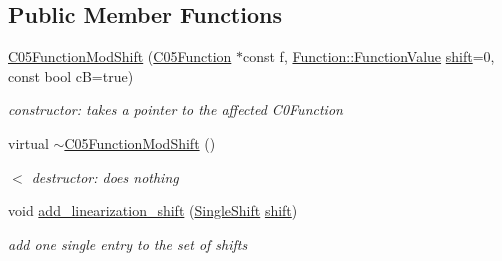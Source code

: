 \subsection*{Public Member Functions}
\begin{DoxyCompactItemize}
\item 
\mbox{\label{class_s_m_spp__di__unipi__it_1_1_c05_function_mod_shift_ac4a61aab21e776c72987bc4aaa075454}} 
\mbox{\hyperlink{class_s_m_spp__di__unipi__it_1_1_c05_function_mod_shift_ac4a61aab21e776c72987bc4aaa075454}{C05\+Function\+Mod\+Shift}} (\mbox{\hyperlink{class_s_m_spp__di__unipi__it_1_1_c05_function}{C05\+Function}} $\ast$const f, \mbox{\hyperlink{class_s_m_spp__di__unipi__it_1_1_function_a9ad432406b609e28d340f73e9474bffe}{Function\+::\+Function\+Value}} \mbox{\hyperlink{class_s_m_spp__di__unipi__it_1_1_function_mod_a177a0111cf0d0fdc5409df06c3b5e282}{shift}}=0, const bool cB=true)
\begin{DoxyCompactList}\small\item\em constructor\+: takes a pointer to the affected C0Function \end{DoxyCompactList}\item 
\mbox{\label{class_s_m_spp__di__unipi__it_1_1_c05_function_mod_shift_a500b054ef82eaca52e82edb8f0dff1d6}} 
virtual \mbox{\hyperlink{class_s_m_spp__di__unipi__it_1_1_c05_function_mod_shift_a500b054ef82eaca52e82edb8f0dff1d6}{$\sim$\+C05\+Function\+Mod\+Shift}} ()
\begin{DoxyCompactList}\small\item\em $<$ destructor\+: does nothing \end{DoxyCompactList}\item 
\mbox{\label{class_s_m_spp__di__unipi__it_1_1_c05_function_mod_shift_a679ca9c4b88900e1aa0e272d99917c83}} 
void \mbox{\hyperlink{class_s_m_spp__di__unipi__it_1_1_c05_function_mod_shift_a679ca9c4b88900e1aa0e272d99917c83}{add\+\_\+linearization\+\_\+shift}} (\mbox{\hyperlink{class_s_m_spp__di__unipi__it_1_1_c05_function_mod_shift_afb6cc9436ab56050982d46debb4297d3}{Single\+Shift}} \mbox{\hyperlink{class_s_m_spp__di__unipi__it_1_1_function_mod_a177a0111cf0d0fdc5409df06c3b5e282}{shift}})
\begin{DoxyCompactList}\small\item\em add one single entry to the set of shifts \end{DoxyCompactList}\item 

\end{DoxyCompactItemize}

